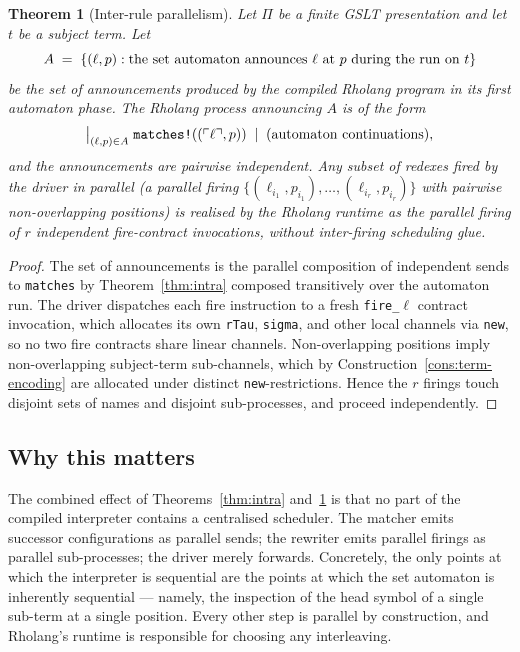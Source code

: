 \documentclass[11pt]{article}
\theoremstyle{plain}
\newtheorem{theorem}{Theorem}[section]
\theoremstyle{definition}
\theoremstyle{remark}
\newcommand{\reflect}[1]{\ulcorner #1 \urcorner}
\begin{document}
\begin{theorem}[Inter-rule parallelism]\label{thm:inter}
Let $\Pi$ be a finite GSLT presentation and let $t$ be a subject term.
Let
\[
  A \;=\; \{(\ell, p) : \text{\textnormal{the set automaton announces $\ell$ at $p$ during the run on $t$}}\}
\]
be the set of announcements produced by the compiled Rholang program in
its first \emph{automaton phase}. The Rholang process announcing $A$ is
of the form
\[
  \bigm|_{(\ell, p) \in A} \texttt{matches!}((\reflect{\ell}, p)) \;\mid\; (\text{automaton continuations}),
\]
and the announcements are pairwise independent. Any subset of redexes
fired by the driver in parallel (a \emph{parallel firing}
$\{(\ell_{i_1}, p_{i_1}), \ldots, (\ell_{i_r}, p_{i_r})\}$ with pairwise
non-overlapping positions) is realised by the Rholang runtime as the
parallel firing of $r$ independent fire-contract invocations, without
inter-firing scheduling glue.
\end{theorem}

\begin{proof}
The set of announcements is the parallel composition of independent
sends to \texttt{matches} by Theorem~\ref{thm:intra} composed
transitively over the automaton run. The driver dispatches each fire
instruction to a fresh \texttt{fire\_$\ell$} contract invocation, which
allocates its own \texttt{rTau}, \texttt{sigma}, and other local
channels via \texttt{new}, so no two fire contracts share linear
channels. Non-overlapping positions imply non-overlapping subject-term
sub-channels, which by Construction~\ref{cons:term-encoding} are
allocated under distinct \texttt{new}-restrictions. Hence the $r$
firings touch disjoint sets of names and disjoint sub-processes, and
proceed independently.
\end{proof}

\subsection{Why this matters}

The combined effect of Theorems~\ref{thm:intra} and~\ref{thm:inter} is
that no part of the compiled interpreter contains a centralised
scheduler. The matcher emits successor configurations as parallel sends;
the rewriter emits parallel firings as parallel sub-processes; the
driver merely forwards. Concretely, the only points at which the
interpreter is sequential are the points at which the set automaton is
inherently sequential --- namely, the inspection of the head symbol of a
single sub-term at a single position. Every other step is parallel by
construction, and Rholang's runtime is responsible for choosing any
interleaving.
\end{document}
